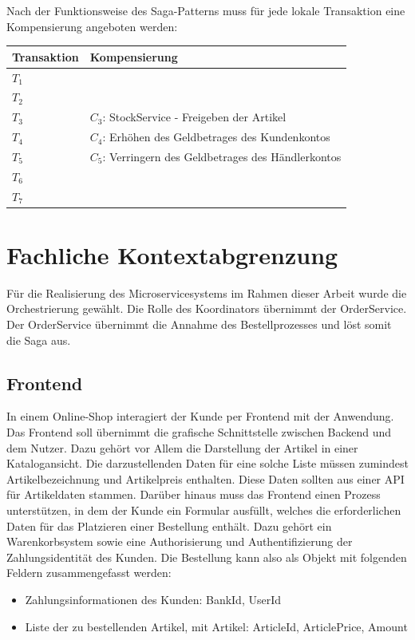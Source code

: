 Nach der Funktionsweise des Saga-Patterns muss für jede lokale Transaktion eine Kompensierung angeboten werden:

\begin{center}
	\begin{tabular}[h]{|p{3cm}|p{9.5cm}|}
		\hline
		Transaktion & Kompensierung \\ \hline
		$T_1$ & \\ \hline
		$T_2$ & \\ \hline
		$T_3$ & $C_3$: StockService - Freigeben der Artikel \\ \hline
		$T_4$ & $C_4$: Erhöhen des Geldbetrages des Kundenkontos \\ \hline
		$T_5$ & $C_5$: Verringern des Geldbetrages des Händlerkontos \\ \hline
		$T_6$ & \\ \hline
		$T_7$ & \\ \hline
	\end{tabular}
\end{center}

\section{Fachliche Kontextabgrenzung}

Für die Realisierung des Microservicesystems im Rahmen dieser Arbeit wurde die Orchestrierung gewählt. %
Die Rolle des Koordinators übernimmt der OrderService. Der OrderService übernimmt die Annahme des Bestellprozesses und löst somit die Saga aus. 

\subsection{Frontend}
In einem Online-Shop interagiert der Kunde per Frontend mit der Anwendung. Das Frontend soll übernimmt die grafische Schnittstelle zwischen Backend und dem Nutzer. Dazu gehört vor Allem die Darstellung der Artikel in einer Katalogansicht. Die darzustellenden Daten für eine solche Liste müssen zumindest Artikelbezeichnung und Artikelpreis enthalten. Diese Daten sollten aus einer API für Artikeldaten stammen. Darüber hinaus muss das Frontend einen Prozess unterstützen, in dem der Kunde ein Formular ausfüllt, welches die erforderlichen Daten für das Platzieren einer Bestellung enthält. Dazu gehört ein Warenkorbsystem sowie eine Authorisierung und Authentifizierung der Zahlungsidentität des Kunden. Die Bestellung kann also als Objekt mit folgenden Feldern zusammengefasst werden:
\begin{itemize}
	\item Zahlungsinformationen des Kunden: BankId, UserId
	\item Liste der zu bestellenden Artikel, mit Artikel: ArticleId, ArticlePrice, Amount
\end{itemize}

